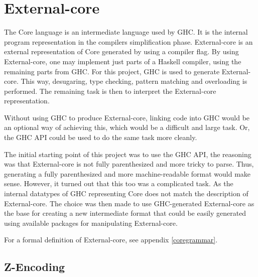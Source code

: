 
\section{External-core}


The Core language is an intermediate language used by GHC. It is the internal
program representation in the compilers simplification phase. External-core
is an external representation of Core generated by using a compiler flag. 
By using External-core, one
may implement just parts of a Haskell compiler, using the remaining parts from
GHC. For this project, GHC is used to generate External-core. This way, desugaring,
type checking, pattern matching and overloading is performed. The remaining task
is then to interpret the External-core representation. \cite{tolmach2010ghc}

Without using GHC to produce External-core, linking code into GHC would be an 
optional way of achieving this, which would be a difficult and large task.
Or, the GHC API could be used to do the same task more cleanly. \cite{tolmach2010ghc}

The initial starting point of this project was to use the GHC API, the reasoning
was that External-core is not fully parenthesized and more tricky to parse. Thus,
generating a fully parenthesized and more machine-readable format would make sense.
However, it turned out that this too was a complicated task. As the internal
datatypes of GHC representing Core does not match the description of External-core. 
The choice was
then made to use GHC-generated External-core as the base for creating a new intermediate
format that could be easily generated using available packages for manipulating
External-core.

For a formal definition of External-core, see appendix \ref{coregrammar}.

\subsection{Z-Encoding}



